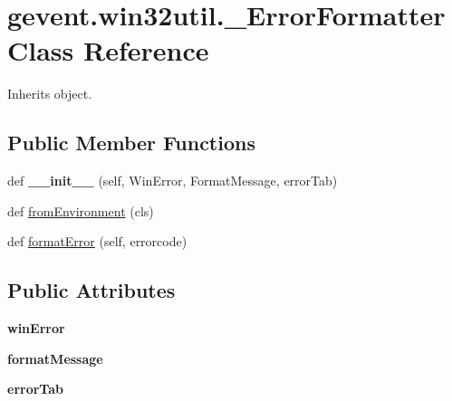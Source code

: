 \hypertarget{classgevent_1_1win32util_1_1___error_formatter}{}\section{gevent.\+win32util.\+\_\+\+Error\+Formatter Class Reference}
\label{classgevent_1_1win32util_1_1___error_formatter}


Inherits object.

\subsection*{Public Member Functions}
\begin{DoxyCompactItemize}
\item 
\mbox{\label{classgevent_1_1win32util_1_1___error_formatter_a891c6611438d404d16826259468b30b4}} 
def {\bfseries \+\_\+\+\_\+init\+\_\+\+\_\+} (self, Win\+Error, Format\+Message, error\+Tab)
\item 
def \hyperlink{classgevent_1_1win32util_1_1___error_formatter_ad5e16793772869bf37441b45203f3ced}{from\+Environment} (cls)
\item 
def \hyperlink{classgevent_1_1win32util_1_1___error_formatter_ad2de43218a67eb8f265c1db29450dec2}{format\+Error} (self, errorcode)
\end{DoxyCompactItemize}
\subsection*{Public Attributes}
\begin{DoxyCompactItemize}
\item 
\mbox{\label{classgevent_1_1win32util_1_1___error_formatter_a8129a370914bab92782f9262bca7c105}} 
{\bfseries win\+Error}
\item 
\mbox{\label{classgevent_1_1win32util_1_1___error_formatter_a65fcbf23ee9027152ff6eacc42cbf920}} 
{\bfseries format\+Message}
\item 
\mbox{\label{classgevent_1_1win32util_1_1___error_formatter_a41b7c74b93393c9cc47f8811665f1662}} 
{\bfseries error\+Tab}
\end{DoxyCompactItemize}


